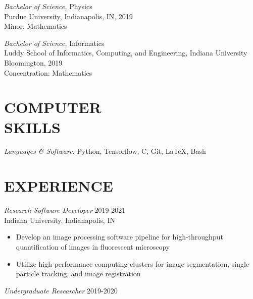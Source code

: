 \documentclass[margin, 10pt]{res} %
\begin{document}
\begin{resume}
{\sl Bachelor of Science,} Physics \\
Purdue University, Indianapolis, IN, 2019\\
Minor: Mathematics 

{\sl Bachelor of Science,} Informatics \\
Luddy School of Informatics, Computing, and Engineering, Indiana University Bloomington, 2019\\
Concentration: Mathematics 
 


\section{COMPUTER \\ SKILLS} 

{\sl Languages \& Software:} 
Python, Tensorflow, C, Git, LaTeX, Bash\\
 
 
\section{EXPERIENCE}

{\sl Research Software Developer} \hfill 2019-2021 \\
Indiana University, Indianapolis, IN

\begin{itemize} \itemsep -2pt %

\item Develop an image processing software pipeline for high-throughput quantification of images in fluorescent microscopy

\item Utilize high performance computing clusters for image segmentation, single particle tracking, and image registration
 
\end{itemize}
 
{\sl Undergraduate Researcher} \hfill 2019-2020
\begin{itemize} \itemsep -2pt %


\end{itemize}
\end{resume}
\end{document}
